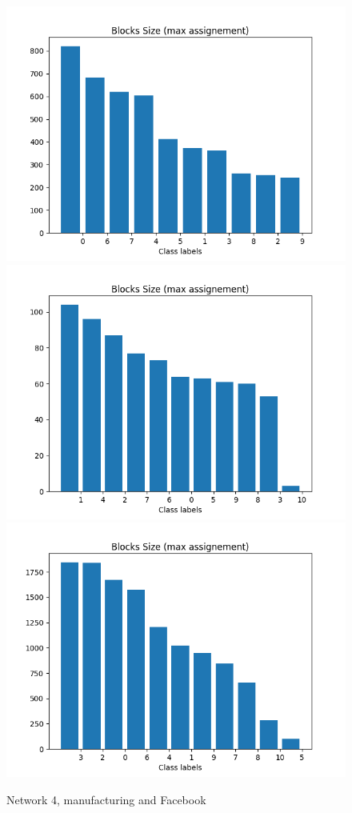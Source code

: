 \documentclass[a4paper, 12pt]{article}
\begin{document}
\begin{figure}[ht]
	\endminipage
		\vspace{-0.28cm}
	\includegraphics[scale=0.27]{img/expe/4_ibp/figure_3}
	\endminipage
	\includegraphics[scale=0.27]{img/expe/5_ibp/figure_3} 
	\endminipage
	\includegraphics[scale=0.27]{img/expe/6_ibp/figure_3}
	\endminipage
    \caption{Network 4, manufacturing and Facebook}

\end{figure}
\end{document}
